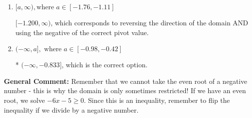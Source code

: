 \documentclass{extbook}[14pt]
\begin{document}
\begin{enumerate}
{\begin{enumerate}[label=\Alph*.]
$(-\infty, -1.200]$, which corresponds to using the negative of the correct pivot value.
\item \( [a, \infty), \text{where } a \in [-1.76, -1.11] \)

$[-1.200, \infty)$, which corresponds to reversing the direction of the domain AND using the negative of the correct pivot value.
\item \( (-\infty, a], \text{ where } a \in [-0.98, -0.42] \)

* $(-\infty, -0.833]$, which is the correct option.
\end{enumerate}

\textbf{General Comment:} Remember that we cannot take the even root of a negative number - this is why the domain is only sometimes restricted! If we have an even root, we solve $-6 x - 5 \geq 0$. Since this is an inequality, remember to flip the inequality if we divide by a negative number.
}
\end{enumerate}
\end{document}
